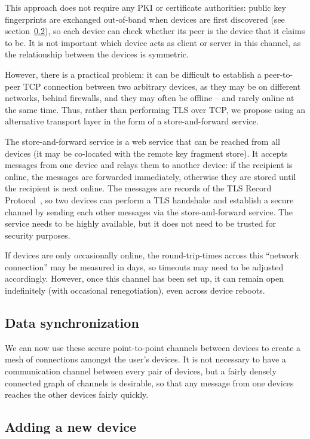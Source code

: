 This approach does not require any PKI or certificate authorities: public key fingerprints are
exchanged out-of-band when devices are first discovered (see section~\ref{sec:newdevice}), so each
device can check whether its peer is the device that it claims to be. It is not important which
device acts as client or server in this channel, as the relationship between the devices is
symmetric.

However, there is a practical problem: it can be difficult to establish a peer-to-peer TCP
connection between two arbitrary devices, as they may be on different networks, behind firewalls,
and they may often be offline -- and rarely online at the same time. Thus, rather than performing
TLS over TCP, we propose using an alternative transport layer in the form of a store-and-forward
service.

The store-and-forward service is a web service that can be reached from all devices (it may be
co-located with the remote key fragment store). It accepts messages from one device and relays them
to another device: if the recipient is online, the messages are forwarded immediately, otherwise
they are stored until the recipient is next online. The messages are records of the TLS Record
Protocol~\cite{TLS}, so two devices can perform a TLS handshake and establish a secure channel by
sending each other messages via the store-and-forward service. The service needs to be highly
available, but it does not need to be trusted for security purposes.

If devices are only occasionally online, the round-trip-times across this ``network connection'' may
be measured in days, so timeouts may need to be adjusted accordingly. However, once this channel has
been set up, it can remain open indefinitely (with occasional renegotiation), even across device
reboots.

\subsection{Data synchronization}\label{sec:devicesync}

We can now use these secure point-to-point channels between devices to create a mesh of connections
amongst the user's devices. It is not necessary to have a communication channel between every pair
of devices, but a fairly densely connected graph of channels is desirable, so that any message from
one devices reaches the other devices fairly quickly.

\subsection{Adding a new device}\label{sec:newdevice}

